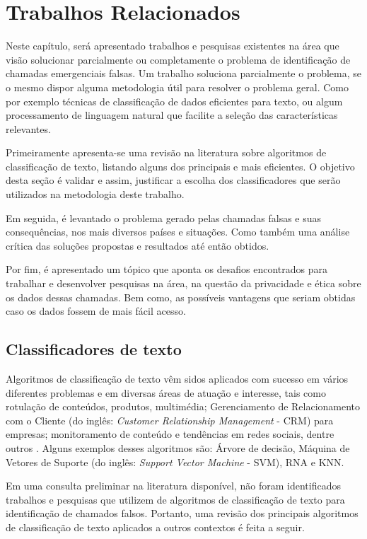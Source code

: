\chapter{Trabalhos Relacionados}
Neste capítulo, será apresentado trabalhos e pesquisas existentes na área que visão solucionar parcialmente ou completamente o problema de identificação de chamadas emergenciais falsas. Um trabalho soluciona parcialmente o problema, se o mesmo dispor alguma metodologia útil para resolver o problema geral. Como por exemplo técnicas de classificação de dados eficientes para texto, ou algum processamento de linguagem natural que facilite a seleção das características relevantes. 

Primeiramente apresenta-se uma revisão na literatura sobre algoritmos de classificação de texto, listando alguns dos principais e mais eficientes. O objetivo desta seção é validar e assim, justificar a escolha dos classificadores que serão utilizados na metodologia deste trabalho.

Em seguida, é levantado o problema gerado pelas chamadas falsas e suas consequências, nos mais diversos países e situações. Como também uma análise crítica das soluções propostas e resultados até então obtidos.

Por fim, é apresentado um tópico que aponta os desafios encontrados para trabalhar e desenvolver pesquisas na área, na questão da privacidade e ética sobre os dados dessas chamadas. Bem como, as possíveis vantagens que seriam obtidas caso os dados fossem de mais fácil acesso.

\section{Classificadores de texto}
Algoritmos de classificação de texto vêm sidos aplicados com sucesso em vários diferentes problemas e em diversas áreas de atuação e interesse, tais como rotulação de conteúdos, produtos, multimédia; Gerenciamento de Relacionamento com o Cliente (do inglês: \textit{Customer Relationship Management} - CRM) para empresas; monitoramento de conteúdo e tendências em redes sociais, dentre outros \citep{uysal2012novel, gupta2018text}. Alguns exemplos desses algoritmos são: Árvore de decisão, Máquina de Vetores de Suporte (do inglês: \textit{Support Vector Machine} - SVM), RNA e KNN.

Em uma consulta preliminar na literatura disponível, não foram identificados trabalhos e pesquisas que utilizem de algoritmos de classificação de texto para identificação de chamados falsos. Portanto, uma revisão dos principais algoritmos de classificação de texto aplicados a outros contextos é feita a seguir.

